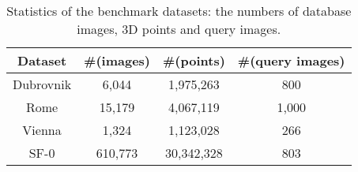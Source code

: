 \documentclass{article}
\begin{document}
	\begin{table}[h]
		\centering
		\begin{tabular}{|c|c|c|c|}
			\hline
			Dataset & \#(images) &\#(points) &\#(query images)\\
			\hline
			Dubrovnik &6,044&1,975,263&800\\
			\hline
			Rome&15,179&4,067,119&1,000\\
			\hline
			Vienna&1,324&1,123,028&266\\
			\hline
			SF-0&610,773&30,342,328&803\\
			\hline
		\end{tabular}
		\caption{Statistics of the benchmark datasets: the numbers of database images, 3D points and query images.}
	\end{table}
	
	
	
	
	
\end{document}
